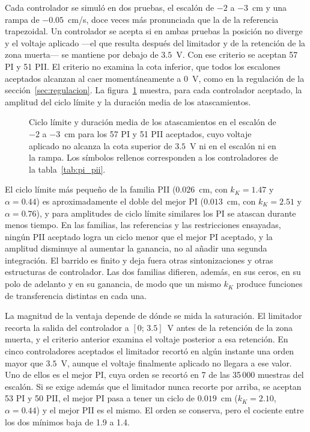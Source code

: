 Cada controlador se simuló en dos pruebas, el escalón de $-2$ a $-3$~cm y una rampa de $-0.05$~cm/s, doce veces más pronunciada que la de la referencia trapezoidal. Un controlador se acepta si en ambas pruebas la posición no diverge y el voltaje aplicado ---el que resulta después del limitador y de la retención de la zona muerta--- se mantiene por debajo de $3.5$~V. Con ese criterio se aceptan 57 PI y 51 PII. El criterio no examina la cota inferior, que todos los escalones aceptados alcanzan al caer momentáneamente a 0~V, como en la regulación de la sección~\ref{sec:regulacion}. La figura~\ref{fig:r15_familias} muestra, para cada controlador aceptado, la amplitud del ciclo límite y la duración media de los atascamientos.

\begin{figure}[ht]
    \centering
    
    \caption[Familias PI y PII]{Ciclo límite y duración media de los atascamientos en el escalón de $-2$ a $-3$~cm para los 57 PI y 51 PII aceptados, cuyo voltaje aplicado no alcanza la cota superior de $3.5$~V ni en el escalón ni en la rampa. Los símbolos rellenos corresponden a los controladores de la tabla~\ref{tab:pi_pii}.}
    \label{fig:r15_familias}
\end{figure}

El ciclo límite más pequeño de la familia PII ($0.026$~cm, con $k_K=1.47$ y $\alpha=0.44$) es aproximadamente el doble del mejor PI ($0.013$~cm, con $k_K=2.51$ y $\alpha=0.76$), y para amplitudes de ciclo límite similares los PI se atascan durante menos tiempo. En las familias, las referencias y las restricciones ensayadas, ningún PII aceptado logra un ciclo menor que el mejor PI aceptado, y la amplitud disminuye al aumentar la ganancia, no al añadir una segunda integración. El barrido es finito y deja fuera otras sintonizaciones y otras estructuras de controlador. Las dos familias difieren, además, en sus ceros, en su polo de adelanto y en su ganancia, de modo que un mismo $k_K$ produce funciones de transferencia distintas en cada una.

La magnitud de la ventaja depende de dónde se mida la saturación. El limitador recorta la salida del controlador a $[0;\,3.5]$~V antes de la retención de la zona muerta, y el criterio anterior examina el voltaje posterior a esa retención. En cinco controladores aceptados el limitador recortó en algún instante una orden mayor que $3.5$~V, aunque el voltaje finalmente aplicado no llegara a ese valor. Uno de ellos es el mejor PI, cuya orden se recortó en 7 de las 35\,000 muestras del escalón. Si se exige además que el limitador nunca recorte por arriba, se aceptan 53 PI y 50 PII, el mejor PI pasa a tener un ciclo de $0.019$~cm ($k_K=2.10$, $\alpha=0.44$) y el mejor PII es el mismo. El orden se conserva, pero el cociente entre los dos mínimos baja de 1.9 a 1.4.

